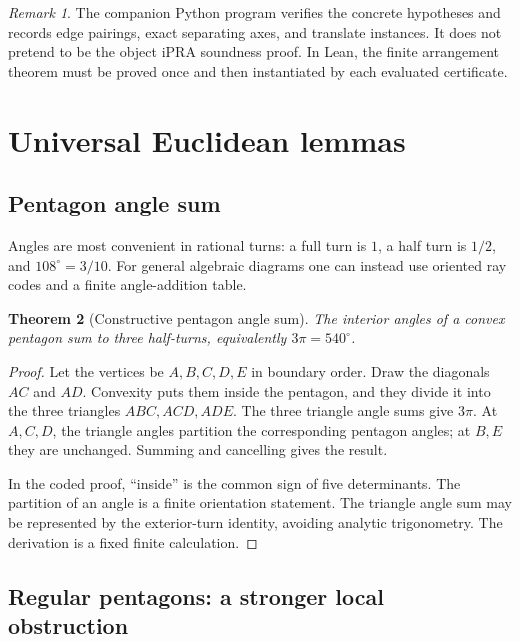 \documentclass[11pt]{article}
\newtheorem{theorem}{Theorem}[section]
\theoremstyle{remark}
\newtheorem{remark}[theorem]{Remark}
\newcommand{\ipra}{\mathrm{iPRA}}
\begin{document}
\begin{remark}
The companion Python program verifies the concrete hypotheses and records
edge pairings, exact separating axes, and translate instances.  It does not pretend to be the object
\(\ipra\) soundness proof.  In Lean, the finite arrangement theorem must be
proved once and then instantiated by each evaluated certificate.
\end{remark}

\section{Universal Euclidean lemmas}
\label{sec:universal}

\subsection{Pentagon angle sum}

Angles are most convenient in rational turns: a full turn is \(1\), a half
turn is \(1/2\), and \(108^\circ=3/10\).  For general algebraic diagrams one
can instead use oriented ray codes and a finite angle-addition table.

\begin{theorem}[Constructive pentagon angle sum]
\label{thm:angle-sum}
The interior angles of a convex pentagon sum to three half-turns, equivalently
\(3\pi=540^\circ\).
\end{theorem}

\begin{proof}
Let the vertices be \(A,B,C,D,E\) in boundary order.  Draw the diagonals
\(AC\) and \(AD\).  Convexity puts them inside the pentagon, and they divide it
into the three triangles \(ABC,ACD,ADE\).  The three triangle angle sums give
\(3\pi\).  At \(A,C,D\), the triangle angles partition the corresponding
pentagon angles; at \(B,E\) they are unchanged.  Summing and cancelling gives
the result.

In the coded proof, ``inside'' is the common sign of five determinants.  The
partition of an angle is a finite orientation statement.  The triangle angle
sum may be represented by the exterior-turn identity, avoiding analytic
trigonometry.  The derivation is a fixed finite calculation.
\end{proof}

\subsection{Regular pentagons: a stronger local obstruction}
\end{document}
